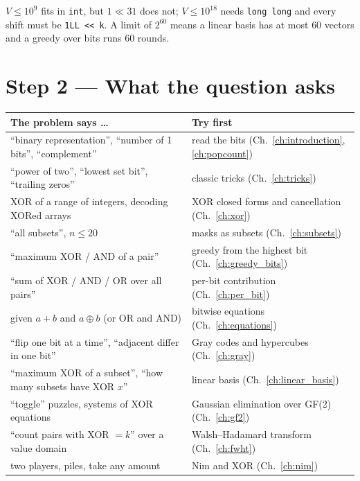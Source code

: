 \begin{insightbox}
$V \le 10^9$ fits in \texttt{int}, but $1 \ll 31$ does not; $V \le 10^{18}$ needs \texttt{long long} and every shift must be \texttt{1LL << k}. A limit of $2^{60}$ means a linear basis has at most $60$ vectors and a greedy over bits runs $60$ rounds.
\end{insightbox}

\clearpage
\section*{Step 2 --- What the question asks}

\begingroup\small\renewcommand{\arraystretch}{1.3}
\begin{tabularx}{\linewidth}{@{}>{\raggedright\arraybackslash}p{6.2cm} X@{}}
\toprule
\textbf{The problem says \ldots} & \textbf{Try first} \\
\midrule
``binary representation'', ``number of 1 bits'', ``complement'' & read the bits (Ch.~\ref{ch:introduction}, \ref{ch:popcount}) \\
``power of two'', ``lowest set bit'', ``trailing zeros'' & classic tricks (Ch.~\ref{ch:tricks}) \\
XOR of a range of integers, decoding XORed arrays & XOR closed forms and cancellation (Ch.~\ref{ch:xor}) \\
``all subsets'', $n \le 20$ & masks as subsets (Ch.~\ref{ch:subsets}) \\
``maximum XOR / AND of a pair'' & greedy from the highest bit (Ch.~\ref{ch:greedy_bits}) \\
``sum of XOR / AND / OR over all pairs'' & per-bit contribution (Ch.~\ref{ch:per_bit}) \\
given $a + b$ and $a \oplus b$ (or OR and AND) & bitwise equations (Ch.~\ref{ch:equations}) \\
``flip one bit at a time'', ``adjacent differ in one bit'' & Gray codes and hypercubes (Ch.~\ref{ch:gray}) \\
``maximum XOR of a subset'', ``how many subsets have XOR $x$'' & linear basis (Ch.~\ref{ch:linear_basis}) \\
``toggle'' puzzles, systems of XOR equations & Gaussian elimination over GF(2) (Ch.~\ref{ch:gf2}) \\
``count pairs with XOR $= k$'' over a value domain & Walsh--Hadamard transform (Ch.~\ref{ch:fwht}) \\
two players, piles, take any amount & Nim and XOR (Ch.~\ref{ch:nim}) \\

\end{tabularx}
